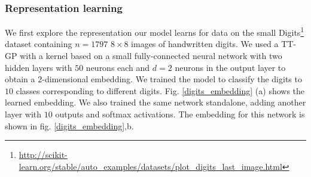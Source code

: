   \subsubsection{Representation learning}
  We first explore the representation our model learns for data on the small
  Digits\footnote{\url{http://scikit-learn.org/stable/auto_examples/datasets/plot_digits_last_image.html}}
  dataset containing $n = 1797$ $8 \times 8$ images of handwritten digits. We
  used a TT-GP with a kernel based on a small fully-connected neural network
  with two hidden layers with $50$ neurons each and $d = 2$ neurons in the output
  layer to obtain a $2$-dimensional embedding. We trained the model to classify
  the digits to $10$ classes corresponding to different digits.
  Fig. \ref{digits_embedding} (a) shows the learned embedding. We also trained the same
  network standalone, adding another layer with $10$ outputs and softmax
  activations. The embedding for this network is shown in fig. \ref{digits_embedding},b.
